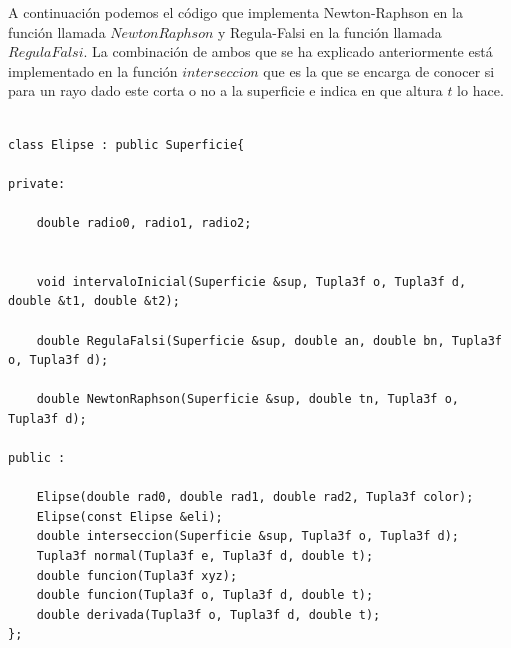 A continuación podemos el código que implementa Newton-Raphson en la función llamada $NewtonRaphson$ y Regula-Falsi en la función llamada $RegulaFalsi$. La combinación de ambos que se ha explicado anteriormente está implementado en la función $interseccion$ que es la que se encarga de conocer si para un rayo dado este corta o no a la superficie e indica en que altura $t$ lo hace.
${ }$\\

\begin{lstlisting}[style=Consola]

class Elipse : public Superficie{
	
private:

	double radio0, radio1, radio2;
	
	
	void intervaloInicial(Superficie &sup, Tupla3f o, Tupla3f d, double &t1, double &t2);
	
	double RegulaFalsi(Superficie &sup, double an, double bn, Tupla3f o, Tupla3f d);
	
	double NewtonRaphson(Superficie &sup, double tn, Tupla3f o, Tupla3f d);
	
public :
	
	Elipse(double rad0, double rad1, double rad2, Tupla3f color);
	Elipse(const Elipse &eli);
	double interseccion(Superficie &sup, Tupla3f o, Tupla3f d);
	Tupla3f normal(Tupla3f e, Tupla3f d, double t);
	double funcion(Tupla3f xyz);
	double funcion(Tupla3f o, Tupla3f d, double t);
	double derivada(Tupla3f o, Tupla3f d, double t);
};
\end{lstlisting}
${ }$\\

